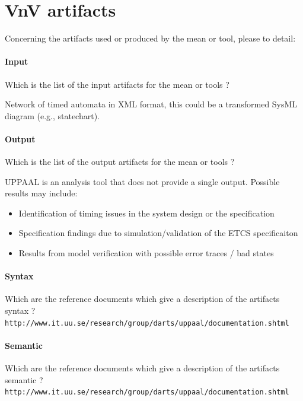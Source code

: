 \section{VnV artifacts}


Concerning the artifacts used or produced by the mean or tool, please to detail:

\paragraph{Input}
    Which is the list of the input artifacts for the mean or tools ?

\begin{author_comment}
   Network of timed automata in XML format, this could be a transformed SysML diagram (e.g., statechart).
\end{author_comment}
    
    
\paragraph{Output}
    Which is the list of the output artifacts for the mean or tools ?

\begin{author_comment}
   UPPAAL is an analysis tool that does not provide a single output. Possible results may include:
   \begin{itemize}
     \item Identification of timing issues in the system design or the specification
     \item Specification findings due to simulation/validation of the ETCS specificaiton
     \item Results from model verification with possible error traces / bad states
   \end{itemize}
\end{author_comment}
    
\paragraph{Syntax}
    Which are the reference documents which give a description of the artifacts syntax  ?
    \verb|http://www.it.uu.se/research/group/darts/uppaal/documentation.shtml|
    
\paragraph{Semantic}
    Which are the reference documents which give a description of the artifacts semantic  ?
    \verb|http://www.it.uu.se/research/group/darts/uppaal/documentation.shtml|

